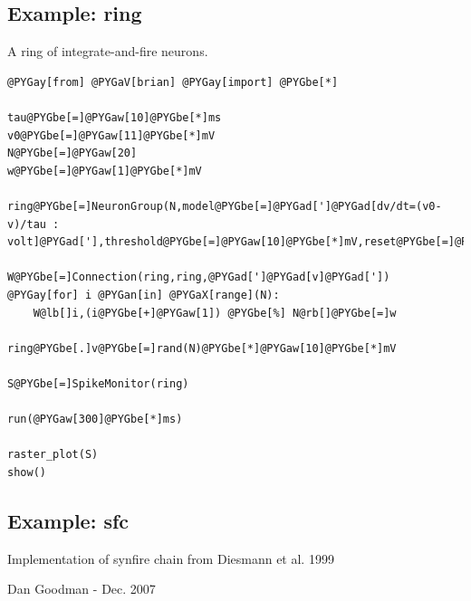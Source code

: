 \documentclass[letterpaper,10pt]{manual}
\begin{document}
\resetcurrentobjects
{}

\hypertarget{index-50}{}\subsection{Example: ring}

A ring of integrate-and-fire neurons.

\begin{Verbatim}[commandchars=@\[\]]
@PYGay[from] @PYGaV[brian] @PYGay[import] @PYGbe[*]

tau@PYGbe[=]@PYGaw[10]@PYGbe[*]ms
v0@PYGbe[=]@PYGaw[11]@PYGbe[*]mV
N@PYGbe[=]@PYGaw[20]
w@PYGbe[=]@PYGaw[1]@PYGbe[*]mV

ring@PYGbe[=]NeuronGroup(N,model@PYGbe[=]@PYGad[']@PYGad[dv/dt=(v0-v)/tau : volt]@PYGad['],threshold@PYGbe[=]@PYGaw[10]@PYGbe[*]mV,reset@PYGbe[=]@PYGaw[0]@PYGbe[*]mV)

W@PYGbe[=]Connection(ring,ring,@PYGad[']@PYGad[v]@PYGad['])
@PYGay[for] i @PYGan[in] @PYGaX[range](N):
    W@lb[]i,(i@PYGbe[+]@PYGaw[1]) @PYGbe[%] N@rb[]@PYGbe[=]w

ring@PYGbe[.]v@PYGbe[=]rand(N)@PYGbe[*]@PYGaw[10]@PYGbe[*]mV

S@PYGbe[=]SpikeMonitor(ring)

run(@PYGaw[300]@PYGbe[*]ms)

raster_plot(S)
show()
\end{Verbatim}

\resetcurrentobjects
{}

\hypertarget{index-51}{}\subsection{Example: sfc}

Implementation of synfire chain from Diesmann et al. 1999

Dan Goodman - Dec. 2007
\end{document}
